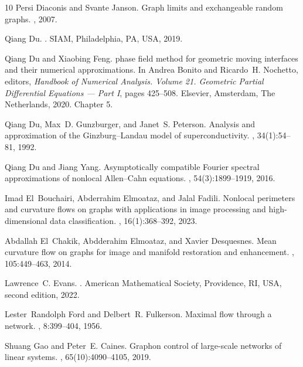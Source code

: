 \documentclass[11pt]{amsart}
\numberwithin{equation}{section}
\begin{document}
\begin{thebibliography}{10}
Persi Diaconis and Svante Janson.
\newblock Graph limits and exchangeable random graphs.
, 2007.

Qiang Du.
.
\newblock SIAM, Philadelphia, PA, USA, 2019.

Qiang Du and Xiaobing Feng.
 phase field method for geometric moving interfaces and their
  numerical approximations.
\newblock In Andrea Bonito and Ricardo~H. Nochetto, editors, {\em Handbook of
  Numerical Analysis. Volume 21. Geometric Partial Differential Equations ---
  Part {I}}, pages 425--508. Elsevier, Amsterdam, The Netherlands, 2020.
\newblock Chapter 5.

Qiang Du, Max~D. Gunzburger, and Janet~S. Peterson.
\newblock Analysis and approximation of the {G}inzburg--{L}andau model of
  superconductivity.
, 34(1):54--81, 1992.

Qiang Du and Jiang Yang.
\newblock Asymptotically compatible {Fourier} spectral approximations of
  nonlocal {Allen--Cahn} equations.
, 54(3):1899--1919, 2016.

Imad El~Bouchairi, Abderrahim Elmoataz, and Jalal Fadili.
\newblock Nonlocal perimeters and curvature flows on graphs with applications
  in image processing and high-dimensional data classification.
, 16(1):368--392, 2023.

Abdallah El~Chakik, Abdderahim Elmoataz, and Xavier Desquesnes.
\newblock Mean curvature flow on graphs for image and manifold restoration and
  enhancement.
, 105:449--463, 2014.

Lawrence~C. Evans.
.
\newblock American Mathematical Society, Providence, RI, USA, second edition,
  2022.

Lester~Randolph Ford and Delbert~R. Fulkerson.
\newblock Maximal flow through a network.
, 8:399--404, 1956.

Shuang Gao and Peter~E. Caines.
\newblock Graphon control of large-scale networks of linear systems.
, 65(10):4090--4105, 2019.


\end{thebibliography}
\end{document}
